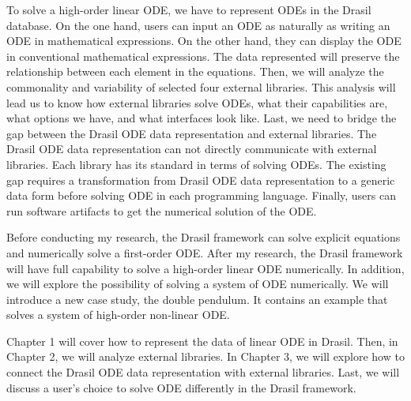 To solve a high-order linear ODE, we have to represent ODEs in the Drasil database. On the one hand, users can input an ODE as naturally as writing an ODE in mathematical expressions. On the other hand, they can display the ODE in conventional mathematical expressions. The data represented will preserve the relationship between each element in the equations. Then, we will analyze the commonality and variability of selected four external libraries. This analysis will lead us to know how external libraries solve ODEs, what their capabilities are, what options we have, and what interfaces look like. Last, we need to bridge the gap between the Drasil ODE data representation and external libraries. The Drasil ODE data representation can not directly communicate with external libraries. Each library has its standard in terms of solving ODEs. The existing gap requires a transformation from Drasil ODE data representation to a generic data form before solving ODE in each programming language. Finally, users can run software artifacts to get the numerical solution of the ODE.

Before conducting my research, the Drasil framework can solve explicit equations and numerically solve a first-order ODE. After my research, the Drasil framework will have full capability to solve a high-order linear ODE numerically. In addition, we will explore the possibility of solving a system of ODE numerically. We will introduce a new case study, the double pendulum. It contains an example that solves a system of high-order non-linear ODE.

Chapter 1 will cover how to represent the data of linear ODE in Drasil. Then, in Chapter 2, we will analyze external libraries. In Chapter 3, we will explore how to connect the Drasil ODE data representation with external libraries. Last, we will discuss a user's choice to solve ODE differently in the Drasil framework.